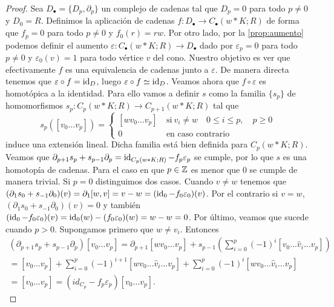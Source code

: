 \begin{proof}
	Sea \(D_{\bullet}= \{D_{p}, \partial_{p}\}\) un complejo de cadenas tal que \(D_{p}
	= 0\) para todo \(p \neq 0\) y \(D_{0} = R\). Definimos la aplicación de cadenas
	\(f: D_{\bullet}\to C_{\bullet}(w \ast K;R)\) de forma que \(f_{p} = 0\) para todo
	\(p \neq 0\) y \(f_{0}(r)=rw\). Por otro lado, por la \autoref{prop:aumento}
	podemos definir el aumento
	\(\varepsilon: C_{\bullet}(w \ast K;R) \to D_{\bullet}\) dado por
	\(\varepsilon_{p}=0\) para todo \(p \neq 0\) y \(\varepsilon_{0}(v) = 1\) para todo
	vértice \(v\) del cono. Nuestro objetivo es ver que efectivamente \(f\) es una equivalencia
	de cadenas junto a \(\varepsilon\). De manera directa tenemos que
	\(\varepsilon \circ f = \operatorname{id}_{D}\), luego \(\varepsilon \circ f \simeq \operatorname{id}_{D}\).
	Veamos ahora que \(f \circ \varepsilon\) es homotópica a la identidad. Para ello
	vamos a definir \(s\) como la familia \(\{s_{p}\}\) de homomorfismos \(s_{p}: C_{p}(
	w \ast K;R) \to C_{p+1}(w \ast K;R)\) tal que
	\[
		s_{p}([v_{0}\ldots v_{p}]) =
		\begin{cases}
			[wv_{0} \ldots v_{p}] \  & \text{si}\ v_{i} \neq w \quad 0 \leq i \leq p,\quad p \geq 0 \\
			0 \                     & \text{en caso contrario}
		\end{cases}
	\]
	induce una extensión lineal. Dicha familia está bien definida para
	\(C_{p}(w \ast K;R)\). Veamos que \(\partial_{p+1}s_{p} + s_{p-1}\partial_{p} = \operatorname{id}
	_{C_p(w \ast K;R)}- f_{p}\varepsilon_{p}\) se cumple, por lo que \(s\) es una
	homotopía de cadenas. Para el caso en que \(p \in \mathbb{Z}\) es menor que \(0\) se cumple
	de manera trivial. Si \(p = 0\) distinguimos dos casos. Cuando \(v \neq w\) tenemos
	que \((\partial_{1}s_{0}+s_{-1}\partial_{0})(v) = \partial_{1}[w,v] = v-w = (\operatorname{id}
	_{0} - f_{0}\varepsilon_{0})(v)\). Por el contrario si \(v = w\), \((\partial_{1}s_{0}
	+s_{-1}\partial_{0})(v) = 0\) y también \((\operatorname{id}_{0} - f_{0}\varepsilon_{0})(v) = \operatorname{id}
	_{0}(w) - (f_{0}\varepsilon_{0})(w) = w - w = 0\). Por último, veamos que sucede
	cuando \(p > 0\). Supongamos primero que \(w \neq v_{i}\). Entonces
	\begin{gather*}
		(\partial_{p+1}s_{p}+ s_{p-1}\partial_{p})[v_{0} \ldots v_{p}] =\partial_{p+1}
		[wv_{0}\ldots v_{p}]+s_{p-1}\left(\sum_{i=0}^{p}(-1)^{i}[v_{0}\ldots\hat{v}_{i}
		\ldots v_{p}]\right) \\ =[v_{0}\ldots v_{p}]+\sum_{i=0}^{p}(-1)^{i+1}[wv_{0}\ldots
		\hat{v}_{i}\ldots v_{p}]+\sum_{i=0}^{p}(-1)^{i}[wv_{0}\ldots\hat{v}_{i}\ldots v_{p}
		] \\ =[v_{0}\ldots v_{p}]=(id_{C_{p}}-f_{p}\varepsilon_{p})[v_{0}\ldots v_{p}].

\end{gather*}
\end{proof}
